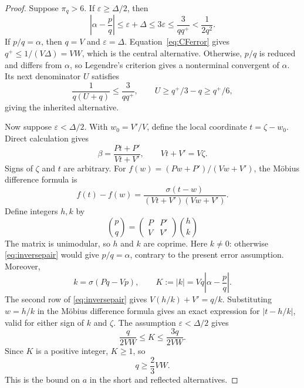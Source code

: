 \documentclass{amsart}
\numberwithin{equation}{section}
\begin{document}
\begin{proof}
Suppose $\pi_q>6$. If $\varepsilon\ge\Delta/2$, then
\begin{equation}\label{eq:oldlegendre}
\left|\alpha-\frac pq\right|
\le\varepsilon+\Delta\le3\varepsilon
\le\frac3{qq^+}<\frac1{2q^2}.
\end{equation}
If $p/q=\alpha$, then $q=V$ and $\varepsilon=\Delta$.
Equation~\eqref{eq:CFerror} gives $q^+\le1/(V\Delta)=VW$,
which is the central alternative. Otherwise, $p/q$ is reduced and differs
from $\alpha$, so Legendre's criterion gives a nonterminal convergent of
$\alpha$. Its next denominator $U$ satisfies
\[
\frac1{q(U+q)}\le\frac3{qq^+},\qquad
U\ge q^+/3-q\ge q^+/6,
\]
giving the inherited alternative.

Now suppose $\varepsilon<\Delta/2$. With $w_0=V'/V$, define the local coordinate $t=\zeta-w_0$. Direct calculation gives
\begin{equation}\label{eq:mobius}
\beta=\frac{Pt+P'}{Vt+V'},\qquad Vt+V'=V\zeta.
\end{equation}
Signs of $\zeta$ and $t$ are arbitrary.
For $f(w)=(Pw+P')/(Vw+V')$, the M\"obius difference formula is
\[
f(t)-f(w)=\frac{\sigma(t-w)}{(Vt+V')(Vw+V')}.
\]
Define integers $h,k$ by
\begin{equation}\label{eq:inversepair}
\binom pq=\begin{pmatrix}P&P'\\V&V'\end{pmatrix}\binom hk
\end{equation}
The matrix is unimodular, so $h$ and $k$ are coprime. Here $k\ne0$:
otherwise \eqref{eq:inversepair} would give $p/q=\alpha$, contrary to
the present error assumption. Moreover,
\[
k=\sigma(Pq-Vp),\qquad
K:=|k|=Vq\left|\alpha-\frac pq\right|.
\]
The second row of \eqref{eq:inversepair} gives $V(h/k)+V'=q/k$.
Substituting $w=h/k$ in the M\"obius difference formula gives an exact
expression for $|t-h/k|$, valid for either sign of $k$ and $\zeta$.
The assumption $\varepsilon<\Delta/2$ gives
\begin{equation}\label{eq:Kbounds}
\frac{q}{2VW}\le K\le\frac{3q}{2VW}.
\end{equation}
Since $K$ is a positive integer, $K\ge1$, so
\begin{equation}\label{eq:qafter}
q\ge\frac23VW.
\end{equation}
This is the bound on $a$ in the short and reflected alternatives.


\end{proof}
\end{document}
